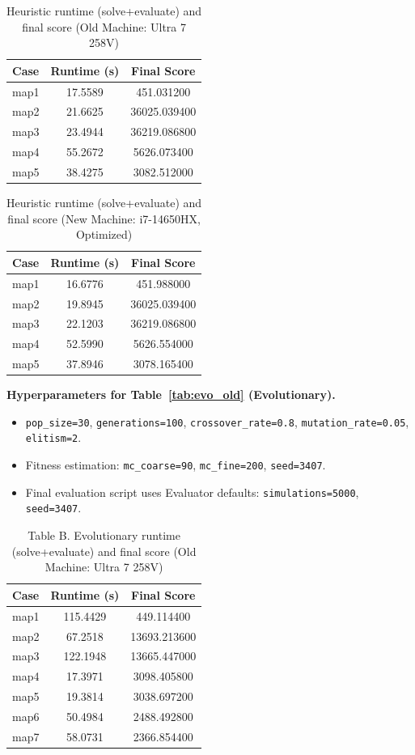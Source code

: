 \documentclass[onecolumn,a4paper,12pt]{IEEEtran}
\begin{document}
\begin{table}[h]
\centering
\caption{Heuristic runtime (solve+evaluate) and final score (Old Machine: Ultra 7 258V)}
\label{tab:heur_old}
\begin{tabular}{lcc}
\toprule
Case & Runtime (s) & Final Score \\
\midrule
map1 & 17.5589 & 451.031200 \\
map2 & 21.6625 & 36025.039400 \\
map3 & 23.4944 & 36219.086800 \\
map4 & 55.2672 & 5626.073400 \\
map5 & 38.4275 & 3082.512000 \\
\bottomrule
\end{tabular}
\end{table}

\begin{table}[h]
\centering
\caption{Heuristic runtime (solve+evaluate) and final score (New Machine: i7-14650HX, Optimized)}
\label{tab:heur_new}
\begin{tabular}{lcc}
\toprule
Case & Runtime (s) & Final Score \\
\midrule
map1 & 16.6776 & 451.988000 \\
map2 & 19.8945 & 36025.039400 \\
map3 & 22.1203 & 36219.086800 \\
map4 & 52.5990 & 5626.554000 \\
map5 & 37.8946 & 3078.165400 \\
\bottomrule
\end{tabular}
\end{table}

\textbf{Hyperparameters for Table~\ref{tab:evo_old} (Evolutionary).}
\begin{itemize}
        \item \texttt{pop\_size=30}, \texttt{generations=100}, \texttt{crossover\_rate=0.8}, \texttt{mutation\_rate=0.05}, \texttt{elitism=2}.
        \item Fitness estimation: \texttt{mc\_coarse=90}, \texttt{mc\_fine=200}, \texttt{seed=3407}.
        \item Final evaluation script uses Evaluator defaults: \texttt{simulations=5000}, \texttt{seed=3407}.
\end{itemize}

\begin{table}[h]
\centering
\caption{Table B. Evolutionary runtime (solve+evaluate) and final score (Old Machine: Ultra 7 258V)}
\begin{tabular}{lcc}
\toprule
Case & Runtime (s) & Final Score \\
\midrule
map1 & 115.4429 & 449.114400 \\
map2 & 67.2518 & 13693.213600 \\
map3 & 122.1948 & 13665.447000 \\
map4 & 17.3971 & 3098.405800 \\
map5 & 19.3814 & 3038.697200 \\
map6 & 50.4984 & 2488.492800 \\
map7 & 58.0731 & 2366.854400 \\
\bottomrule
\end{tabular}
\end{table}
\end{document}
